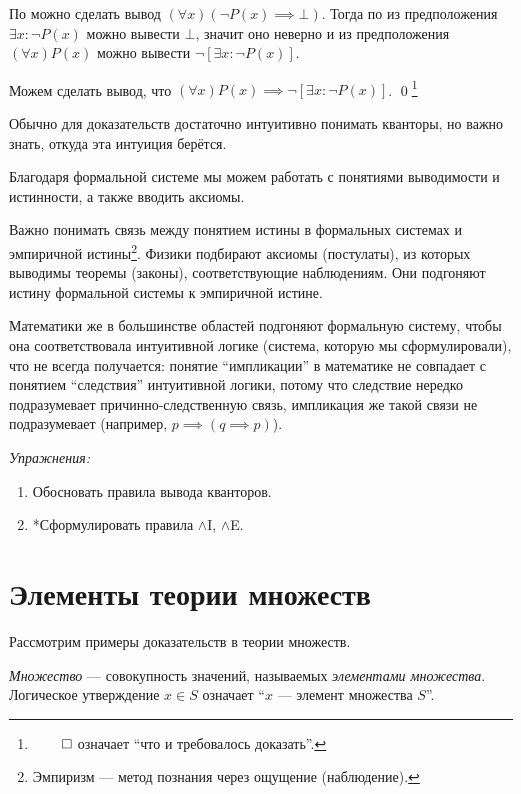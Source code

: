 По \Aii{} можно сделать вывод $(\forall x)(\lnot P(x)\implies\bot)$.
Тогда по \Eee{} из предположения ${\exists x:\lnot P(x)}$ можно вывести $\bot$,
значит оно неверно и из предположения $(\forall x)P(x)$
можно вывести $\lnot[\exists x:\lnot P(x)]$.

Можем сделать вывод, что $(\forall x)P(x)\implies \lnot[\exists x:\lnot P(x)]$.
\qed\footnote{$\qed$ означает ``что и требовалось доказать''.}

Обычно для доказательств достаточно интуитивно понимать кванторы,
но важно знать, откуда эта интуиция берётся.

Благодаря формальной системе мы можем работать с понятиями выводимости
и истинности, а также вводить аксиомы.

Важно понимать связь между понятием истины в формальных системах
и эмпиричной истины\footnote{Эмпиризм --- метод познания через ощущение (наблюдение).}.
Физики подбирают аксиомы (постулаты),
из которых выводимы теоремы (законы), соответствующие наблюдениям.
Они подгоняют истину формальной системы к эмпиричной истине.

Математики же
в большинстве областей подгоняют формальную систему,
чтобы она соответствовала интуитивной логике (система, которую мы сформулировали),
что не всегда получается: понятие ``импликации'' в математике не совпадает
с понятием ``следствия'' интуитивной логики, потому что следствие
нередко подразумевает причинно-следственную
связь, импликация же такой связи не подразумевает (например, ${p\implies(q\implies p)}$).

	{\it Упражнения:}

\begin{enumerate}
	\item{}Обосновать правила вывода кванторов.

	\item{}*Сформулировать правила $\land$I, $\land$E.
\end{enumerate}

\pagebreak

\section{Элементы теории множеств}

Рассмотрим примеры доказательств в теории множеств.

{\it Множество} --- совокупность значений, называемых {\it элементами множества}.
Логическое утверждение $x\in S$ означает ``$x$ --- элемент множества $S$''.

